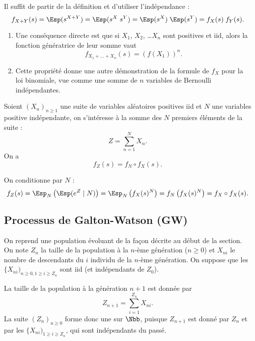 \proof
Il suffit de partir de la définition et d'utiliser l'indépendance :
$$
f_{X+Y}(s) 
= \Esp(s^{X+Y}) = \Esp(s^X \; s^Y) = \Esp(s^X) \;  \Esp(s^Y)
= f_X(s) \; f_Y(s).
$$
\eproof

\remarks
\begin{enumerate}
  \item Une conséquence directe est que si $X_1$, $X_2$, \dots $X_n$ sont positives et iid, alors la fonction génératrice de leur somme vaut
  $$
  f_{X_1 + \dots + X_n}(s) = \left(f(X_1)\right)^n.
  $$
  \item Cette propriété donne une autre démonstration de la formule de $f_X$ pour la loi binomiale, vue comme une somme de $n$ variables de Bernoulli indépendantes.
\end{enumerate}

\begin{proposition} \label{prop:fGeneratriceSommeAleatoire}
  Soient $(X_n)_{n \geq 1}$ une suite de variables aléatoires positives iid et $N$ une variables positive indépendante, on s'intéresse à la somme des $N$ premiers éléments de la suite :
  $$
  Z = \sum_{n=1}^N X_n.
  $$
  On a 
  $$
  f_{Z}(s) = f_N \circ f_X(s).
  $$
\end{proposition}

\proof
On conditionne par $N$ :
\begin{align*}
  f_Z(s) 
  = \Esp_N \left(\Esp(e^Z \mid N) \right)
  = \Esp_N \left(f_X(s)^N \right)
  = f_N \left(f_X(s)^N \right) = f_X \circ f_X(s).
\end{align*}

\eproof

\subsection{Processus de Galton-Watson (GW)} 

On reprend une population évoluant de la façon décrite au début de la section. 
On note $Z_n$ la taille de la population à la $n$-ème génération ($n \geq 0$) et $X_{ni}$ le nombre de descendants du $i$ individu de la $n$-ème génération. 
On suppose que les $\{X_{ni})_{n \geq 0, 1 \geq i \geq Z_n}$ sont iid (et indépendants de $Z_0$).

\bigskip
La taille de la population à la génération $n+1$ est donnée par 
\begin{equation} \label{eq:recurrenceGW}
Z_{n+1} = \sum_{i = 1}^{Z_n} X_{ni}.
\end{equation}
La suite $(Z_n)_{n \geq 0}$ forme donc une \cM sur $\Nbb$, puisque $Z_{n+1}$ est donné par $Z_n$ et par les $\{X_{ni})_{1 \geq i \geq Z_n}$, qui sont indépendants du passé.

